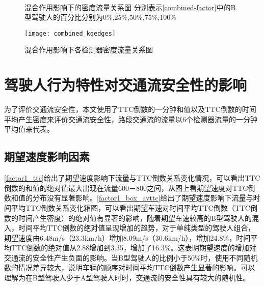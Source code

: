 \begin{figure}[htb]%
\centering
{}%
\\%
%
\caption[A set of four sub-floats.]{混合作用影响下的密度流量关系图
分别表示\autoref{combined-factor}中的B型驾驶人的百分比分别为0\%,25\%,50\%,75\%,100\%}%
\label{combined_kq}%
\end{figure}

\begin{figure}[htb]
\begin{center}
\texttt{[image: combined\_kqedges]}
\caption{混合作用影响下各检测器密度流量关系图}
\label{combined_kqedges}
\end{center}
\end{figure}

\FloatBarrier

\section{驾驶人行为特性对交通流安全性的影响}

为了评价交通流安全性，本文使用了TTC倒数的一分钟和值以及TTC倒数的时间平均产生密度来评价交通流安全性，路段交通流的流量以6个检测器流量的一分钟平均值来代表。


\subsection{期望速度影响因素}

\autoref{factor1_ttc}给出了期望速度影响下流量与TTC倒数关系变化情况，可以看出TTC倒数的和值的绝对值最大出现在流量600－800之间，从图上看期望速度对TTC倒数和值的分布没有显著影响。\autoref{factor1_box_avttc}给出了期望速度影响下流量与时间平均TTC倒数关系变化箱图，可以看出期望车速对时间平均TTC倒数（TTC倒数的时间产生密度）的绝对值有显著的影响，随着期望车速较高的B型驾驶人的混入，时间平均TTC倒数的绝对值呈现增加的趋势，对于单纯类型的驾驶人组合，期望速度由6.48m/s（23.3km/h）增加8.09m/s（30.6km/h），增加24.8\%，时间平均TTC倒数的绝对值从2.88增加到3.35，增加了16.3\%。这表明期望速度的增加对交通流的安全性产生负面的影响。当B型驾驶人的比例小于50\%时，使用不同随机数的情况差异较大，说明车辆的顺序对时间平均TTC倒数产生显著的影响。可以理解为在B型驾驶人少于A型驾驶人时时，交通流的安全性具有较大的随机性。

